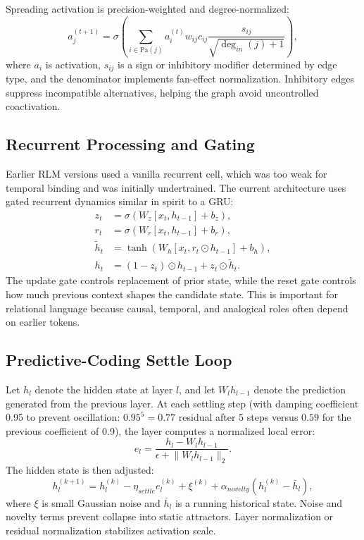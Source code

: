 \documentclass[11pt]{article}
\begin{document}
Spreading activation is precision-weighted and degree-normalized:
\begin{equation}
 a_j^{(t+1)} = \sigma\left( \sum_{i \in \mathrm{Pa}(j)} a_i^{(t)} w_{ij} c_{ij} \frac{s_{ij}}{\sqrt{\deg_{in}(j)+1}} \right),
\end{equation}
where $a_i$ is activation, $s_{ij}$ is a sign or inhibitory modifier determined by edge type, and the denominator implements fan-effect normalization. Inhibitory edges suppress incompatible alternatives, helping the graph avoid uncontrolled coactivation.

\subsection{Recurrent Processing and Gating}
Earlier RLM versions used a vanilla recurrent cell, which was too weak for temporal binding and was initially undertrained. The current architecture uses gated recurrent dynamics similar in spirit to a GRU:
\begin{align}
 z_t &= \sigma(W_z [x_t,h_{t-1}] + b_z),\\
 r_t &= \sigma(W_r [x_t,h_{t-1}] + b_r),\\
 \tilde{h}_t &= \tanh(W_h [x_t,r_t \odot h_{t-1}] + b_h),\\
 h_t &= (1-z_t)\odot h_{t-1} + z_t\odot \tilde{h}_t.
\end{align}
The update gate controls replacement of prior state, while the reset gate controls how much previous context shapes the candidate state. This is important for relational language because causal, temporal, and analogical roles often depend on earlier tokens.

\subsection{Predictive-Coding Settle Loop}
Let $h_l$ denote the hidden state at layer $l$, and let $W_l h_{l-1}$ denote the prediction generated from the previous layer. At each settling step (with damping coefficient 0.95 to prevent oscillation: $0.95^5 = 0.77$ residual after 5 steps versus $0.59$ for the previous coefficient of 0.9), the layer computes a normalized local error:
\begin{equation}
 e_l = \frac{h_l - W_l h_{l-1}}{\epsilon + \lVert W_l h_{l-1}\rVert_2}.
\end{equation}
The hidden state is then adjusted:
\begin{equation}
 h_l^{(k+1)} = h_l^{(k)} - \eta_{settle}e_l^{(k)} + \xi^{(k)} + \alpha_{novelty}(h_l^{(k)}-\bar{h}_l),
\end{equation}
where $\xi$ is small Gaussian noise and $\bar{h}_l$ is a running historical state. Noise and novelty terms prevent collapse into static attractors. Layer normalization or residual normalization stabilizes activation scale.
\end{document}

